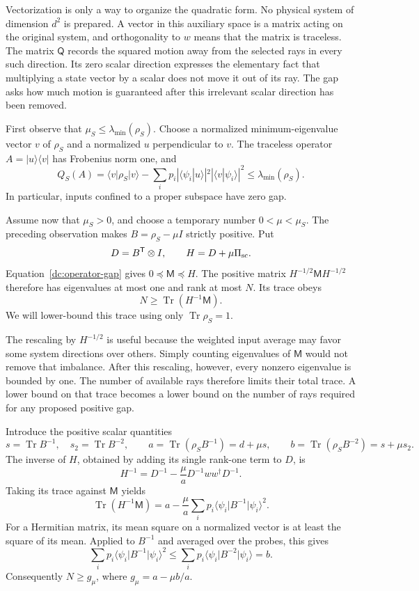 \documentclass[11pt,a4paper]{article}
\newcommand{\ket}[1]{\lvert #1\rangle}
\newcommand{\bra}[1]{\langle #1\rvert}
\newcommand{\Tr}{\operatorname{Tr}}
\numberwithin{equation}{section}
\begin{document}
Vectorization is only a way to organize the quadratic form.  No physical
system of dimension $d^2$ is prepared.  A vector in this auxiliary space is
a matrix acting on the original system, and orthogonality to $w$ means that
the matrix is traceless.  The matrix $\mathsf Q$ records the squared motion
away from the selected rays in every such direction.  Its zero scalar
direction expresses the elementary fact that multiplying a state vector
by a scalar does not move it out of its ray.  The gap asks how much motion
is guaranteed after this irrelevant scalar direction has been removed.

First observe that $\mu_S\leq\lambda_{\min}(\rho_S)$.  Choose a normalized
minimum-eigenvalue vector $v$ of $\rho_S$ and a normalized $u$ perpendicular
to $v$.  The traceless operator $A=\ket{u}\bra{v}$ has Frobenius norm one,
and
\[
 Q_S(A)=\bra{v}\rho_S\ket{v}
 -\sum_i p_i|\langle\psi_i|u\rangle|^2
                 |\langle v|\psi_i\rangle|^2
 \leq\lambda_{\min}(\rho_S).
\]
In particular, inputs confined to a proper subspace have zero gap.

Assume now that $\mu_S>0$, and choose a temporary number
$0<\mu<\mu_S$.  The preceding observation makes
$B=\rho_S-\mu I$ strictly positive.  Put
\[
 D=B^{\mathsf T}\otimes I,
 \qquad H=D+\mu\Pi_{\rm sc}.
\]
Equation~\eqref{dc:operator-gap} gives $0\preceq\mathsf M\preceq H$.
The positive matrix $H^{-1/2}\mathsf M H^{-1/2}$ therefore has eigenvalues
at most one and rank at most $N$.  Its trace obeys
\begin{equation}
 N\geq\Tr(H^{-1}\mathsf M).
 \label{dc:rank-trace}
\end{equation}
We will lower-bound this trace using only $\Tr\rho_S=1$.

The rescaling by $H^{-1/2}$ is useful because the weighted input average may
favor some system directions over others.  Simply counting eigenvalues of
$\mathsf M$ would not remove that imbalance.  After this rescaling, however,
every nonzero eigenvalue is bounded by one.  The number of available rays
therefore limits their total trace.  A lower bound on that trace becomes a
lower bound on the number of rays required for any proposed positive gap.

Introduce the positive scalar quantities
\[
 s=\Tr B^{-1},\quad s_2=\Tr B^{-2},\qquad
 a=\Tr(\rho_SB^{-1})=d+\mu s,\qquad
 b=\Tr(\rho_SB^{-2})=s+\mu s_2.
\]
The inverse of $H$, obtained by adding its single rank-one term to $D$, is
\[
 H^{-1}=D^{-1}-\frac{\mu}{a}D^{-1}ww^\dagger D^{-1}.
\]
Taking its trace against $\mathsf M$ yields
\[
 \Tr(H^{-1}\mathsf M)
 =a-\frac{\mu}{a}
       \sum_i p_i\bra{\psi_i}B^{-1}\ket{\psi_i}^{\!2}.
\]
For a Hermitian matrix, its mean square on a normalized vector is at least
the square of its mean.  Applied to $B^{-1}$ and averaged over the probes,
this gives
\[
 \sum_i p_i\bra{\psi_i}B^{-1}\ket{\psi_i}^{\!2}
 \leq\sum_i p_i\bra{\psi_i}B^{-2}\ket{\psi_i}=b.
\]
Consequently $N\geq g_\mu$, where $g_\mu=a-\mu b/a$.
\end{document}
